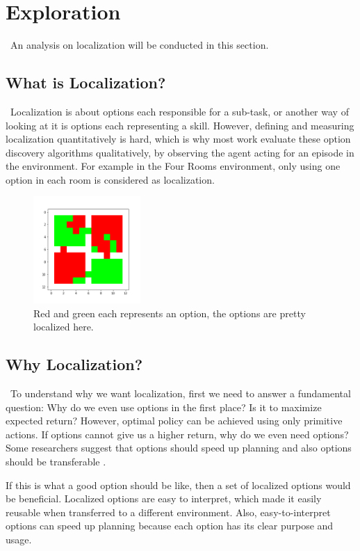 \documentclass{article}
\begin{document}
	\section{Exploration}
	\qquad \ An analysis on localization will be conducted in this section.
	\subsection*{What is Localization?}
	\qquad \ Localization is about options each responsible for a sub-task, or another way of looking at it is options each representing a skill. However, defining and measuring localization quantitatively is hard, which is why most work evaluate these option discovery algorithms qualitatively, by observing the agent acting for an episode in the environment. For example in the Four Rooms environment, only using one option in each room is considered as localization.
	\begin{figure}[h]
		\centering
		\includegraphics[width=1.6in]{cherryPicked.png}
		\caption{Red and green each represents an option, the options are pretty localized here.}
	\end{figure}
	\subsection*{Why Localization?}
	\qquad \ To understand why we want localization, first we need to answer a fundamental question: Why do we even use options in the first place? Is it to maximize expected return? However, optimal policy can be achieved using only primitive actions. If options cannot give us a higher return, why do we even need options? Some researchers suggest that options should speed up planning \cite{harb2017waiting} \cite{harutyunyan2019termination} and also options should be transferable \cite{khetarpal2020options} \cite{attentionoptioncritic}.
	
	\quad If this is what a good option should be like, then a set of localized options would be beneficial. Localized options are easy to interpret, which made it easily reusable when transferred to a different environment. Also, easy-to-interpret options can speed up planning because each option has its clear purpose and usage.
\end{document}
